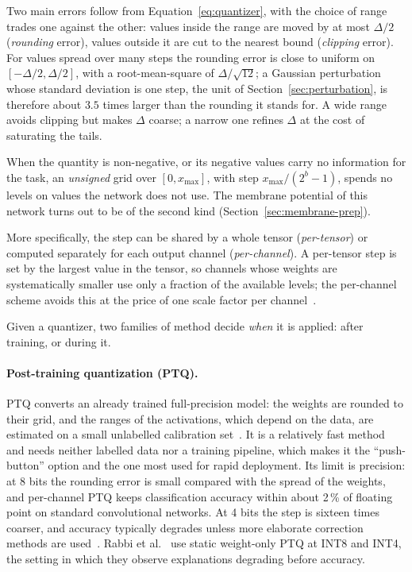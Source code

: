Two main errors follow from Equation~\ref{eq:quantizer}, with the choice of range
trades one against the other: values inside the range are moved by at most
$\Delta/2$ (\emph{rounding} error), values outside it are cut to the nearest
bound (\emph{clipping} error). For values spread over many steps the rounding
error is close to uniform on $[-\Delta/2, \Delta/2]$, with a root-mean-square of
$\Delta/\sqrt{12}$; a Gaussian perturbation whose standard deviation is one step,
the unit of Section~\ref{sec:perturbation}, is therefore about $3.5$ times
larger than the rounding it stands for. A wide range avoids clipping but makes
$\Delta$ coarse; a narrow one refines $\Delta$ at the cost of saturating the
tails.

When the quantity is non-negative, or its negative values carry no information
for the task, an \emph{unsigned} grid over $[0, x_{\max}]$, with step
$x_{\max}/(2^b - 1)$, spends no levels on values the network does not use. The
membrane potential of this network turns out to be of the second kind
(Section~\ref{sec:membrane-prep}).

More specifically, the step can be shared by a whole tensor (\emph{per-tensor}) or computed
separately for each output channel (\emph{per-channel}). A per-tensor step is
set by the largest value in the tensor, so channels whose weights are
systematically smaller use only a fraction of the available levels; the
per-channel scheme avoids this at the price of one scale factor per
channel~\cite{krishnamoorthi2018whitepaper, nagel2021whitepaper}.

Given a quantizer, two families of method decide \emph{when} it is applied:
after training, or during it.

\paragraph{Post-training quantization (PTQ).} PTQ converts an already trained
full-precision model: the weights are rounded to their grid,
and the ranges of the activations, which depend on the data, are estimated on a
small unlabelled calibration set~\cite{nagel2021whitepaper}. It is a relatively fast method and
needs neither labelled data nor a training pipeline, which makes it the
``push-button'' option and the one most used for rapid deployment. Its limit is
precision: at 8 bits the rounding error is small compared with the spread of the
weights, and per-channel PTQ keeps classification accuracy within about 2\,\% of
floating point on standard convolutional networks. At 4 bits the step is sixteen
times coarser, and accuracy typically degrades unless more elaborate correction
methods are used~\cite{krishnamoorthi2018whitepaper, nagel2021whitepaper}. Rabbi et
al.~\cite{rabbi2026} use static weight-only PTQ at INT8 and INT4, the setting in which
they observe explanations degrading before accuracy.

